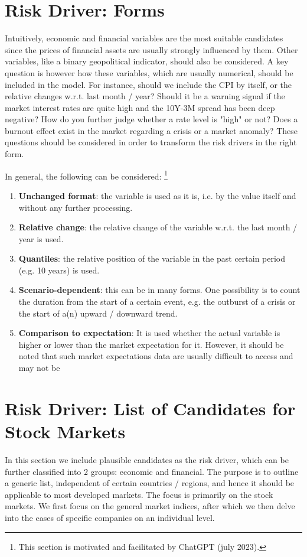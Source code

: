 \section{Risk Driver: Forms}
Intuitively, economic and financial variables are the most suitable candidates since the prices of financial assets are usually strongly influenced by them. Other variables, like a binary geopolitical indicator, should also be considered. A key question is however how these variables, which are usually numerical, should be included in the model. For instance, should we include the CPI by itself, or the relative changes w.r.t. last month / year? Should it be a warning signal if the market interest rates are quite high and the 10Y-3M spread has been deep negative? How do you further judge whether a rate level is "high" or not? Does a burnout effect exist in the market regarding a crisis or a market anomaly? These questions should be considered in order to transform the risk drivers in the right form. 

In general, the following can be considered: \footnote{This section is motivated and facilitated by ChatGPT (july 2023). }
\begin{enumerate}
	\item \textbf{Unchanged format}: the variable is used as it is, i.e. by the value itself and without any further processing. 
	\item \textbf{Relative change}: the relative change of the variable w.r.t. the last month / year is used. 
	\item \textbf{Quantiles}: the relative position of the variable in the past certain period (e.g. 10 years) is used. 
	\item \textbf{Scenario-dependent}: this can be in many forms. One possibility is to count the duration from the start of a certain event, e.g. the outburst of a crisis or the start of a(n) upward / downward trend. 
	\item \textbf{Comparison to expectation}: It is used whether the actual variable is higher or lower than the market expectation for it. However, it should be noted that such market expectations data are usually difficult to access and may not be 
\end{enumerate}

\section{Risk Driver: List of Candidates for Stock Markets}

In this section we include plausible candidates as the risk driver, which can be further classified into 2 groups: economic and financial. The purpose is to outline a generic list, independent of certain countries / regions, and hence it should be applicable to most developed markets. 
The focus is primarily on the stock markets. We first focus on the general market indices, after which we then delve into the cases of specific companies on an individual level. 

